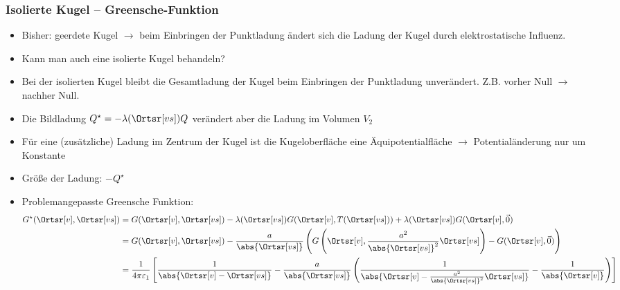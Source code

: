   \begin{frame}
    \frametitle{Isolierte Kugel -- Greensche-Funktion}
    \begin{itemize}[<+->]
    \item Bisher: \alert{geerdete Kugel} $\to$ beim Einbringen der Punktladung ändert sich die Ladung der Kugel durch elektrostatische Influenz.
    \item Kann man auch eine \alert{isolierte Kugel} behandeln?
    \item Bei der isolierten Kugel bleibt die Gesamtladung der Kugel beim Einbringen der Punktladung unverändert. Z.B. vorher Null $\to$ nachher Null.
    \item Die Bildladung $Q^\star = -\lambda(\Ortsr[vs]) Q$ verändert aber die Ladung im Volumen $V_2$
    \item Für eine (zusätzliche) Ladung im Zentrum der Kugel ist die Kugeloberfläche eine \alert{Äquipotentialfläche} $\to$ Potentialänderung nur um Konstante
    \item Größe der Ladung: $-Q^\star$
    \item Problemangepasste Greensche Funktion:
      \begin{align*}
        G^\star(\Ortsr[v], \Ortsr[vs]) & =  G(\Ortsr[v], \Ortsr[vs]) - \lambda(\Ortsr[vs]) G(\Ortsr[v], T(\Ortsr[vs])) + \lambda(\Ortsr[vs]) G(\Ortsr[v], \vec{0}) \\
& = G(\Ortsr[v], \Ortsr[vs]) - \frac{a}{\abs{\Ortsr[vs]}} \left( G\left(\Ortsr[v], \frac{a^2}{\abs{\Ortsr[vs]}^2} \Ortsr[vs]\right) - G(\Ortsr[v], \vec{0}) \right) \\
& = \frac{1}{4\pi\varepsilon_1} \left[ \frac{1}{\abs{\Ortsr[v] - \Ortsr[vs]}} - \frac{a}{\abs{\Ortsr[vs]}} \left( \frac{1}{\abs{\Ortsr[v]- \frac{a^2}{\abs{\Ortsr[vs]}^2} \Ortsr[vs]}} - \frac{1}{ \abs{\Ortsr[v]}} \right) \right]
      \end{align*}
      \end{itemize}
\end{frame}


